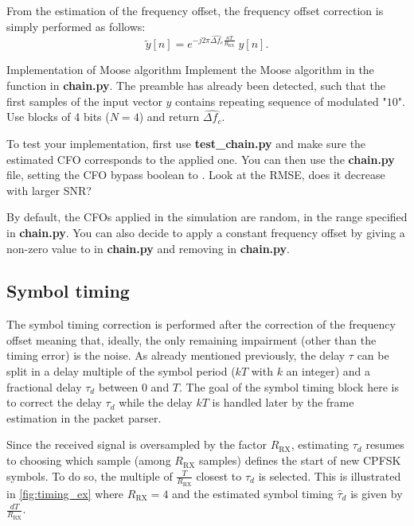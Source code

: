 From the estimation of the frequency offset, the frequency offset correction is simply performed as follows:
\begin{equation*}
    \tilde{y}[n] = e^{-j2\pi \widehat{\Delta f_c} \frac{nT}{R_{\text{RX}}}}\:y[n].
\end{equation*}


\begin{bclogo}[couleur = gray!20, arrondi = 0.2, logo=\bccrayon]{Implementation of Moose algorithm}
Implement the Moose algorithm in the  function in \textbf{chain.py}. The preamble has already been detected, such that the first samples of the input vector $y$ contains repeating sequence of modulated "$10$". Use blocks of 4 bits ($N=4$) and return $\widehat{\Delta f_c}$.

To test your implementation, first use \textbf{test_chain.py} and make sure the estimated CFO corresponds to the applied one. You can then use the \textbf{chain.py} file, setting the CFO bypass boolean to . Look at the RMSE, does it decrease with larger SNR?

By default, the CFOs applied in the simulation are random, in the range specified in \textbf{chain.py}. You can also decide to apply a constant frequency offset by giving a non-zero value to  in \textbf{chain.py} and removing  in \textbf{chain.py}.
\end{bclogo}



\subsection{Symbol timing}
The symbol timing correction is performed after the correction of the frequency offset meaning that, ideally, the only remaining impairment (other than the timing error) is the noise. As already mentioned previously, the delay $\tau$ can be split in a delay multiple of the symbol period ($kT$ with $k$ an integer) and a fractional delay $\tau_d$ between 0 and $T$. The goal of the symbol timing block here is to correct the delay $\tau_d$ while the delay $kT$ is handled later by the frame estimation in the packet parser.

Since the received signal is oversampled by the factor $R_{\text{RX}}$, estimating $\tau_d$ resumes to choosing which sample (among $R_{\text{RX}}$ samples) defines the start of new CPFSK symbols. To do so, the multiple of $\frac{T}{R_{\text{RX}}}$
closest to $\tau_d$ is selected. This is illustrated in \autoref{fig:timing_ex} where $R_{\text{RX}}=4$ and the estimated symbol timing $\hat{\tau}_d$ is given by $\frac{dT}{R_{\text{RX}}}$.

